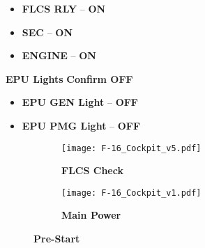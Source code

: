 \begin{tablenumerate}
{\begin{subenumerate}
\begin{itemize}
            \item \textbf{FLCS RLY} -- \textbf{ON}
            \item \textbf{SEC} -- \textbf{ON}
            \item \textbf{ENGINE} -- \textbf{ON}
        \end{itemize}
        \item \textbf{EPU Lights} \dotfill \textbf{Confirm OFF}
        \begin{itemize}
            \item \textbf{EPU GEN Light} -- \textbf{OFF}
            \item \textbf{EPU PMG Light} -- \textbf{OFF}
        \end{itemize}
    \end{subenumerate}}
\end{tablenumerate}


\begin{figure}[h]
    \centering
    \begin{subfigure}[t]{0.45\linewidth}
        \centering
        \texttt{[image: F-16\_Cockpit\_v5.pdf]}
        \caption*{\textbf{FLCS Check}}
        \label{fig:proc:prestart:flcscheck}
    \end{subfigure}
    \begin{subfigure}[t]{0.45\linewidth}
        \centering
        \texttt{[image: F-16\_Cockpit\_v1.pdf]}
        \caption*{\textbf{Main Power}}
        \label{fig:proc:prestart:mainpower}
    \end{subfigure}
    \caption{\textbf{Pre-Start}}
    \label{fig:proc:prestart}
\end{figure}

\clearpage

